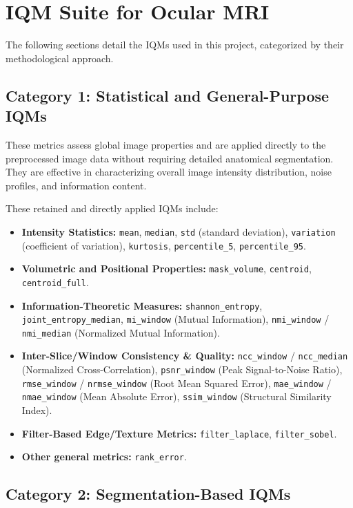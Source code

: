 \section{IQM Suite for Ocular MRI}
The following sections detail the IQMs used in this project, categorized by their methodological approach.

\subsection{Category 1: Statistical and General-Purpose IQMs}
These metrics assess global image properties and are applied directly to the preprocessed image data without requiring detailed anatomical segmentation. They are effective in characterizing overall image intensity distribution, noise profiles, and information content.

These retained and directly applied IQMs include:
\begin{itemize}
    \item \textbf{Intensity Statistics:} \texttt{mean}, \texttt{median}, \texttt{std} (standard deviation), \texttt{variation} (coefficient of variation), \texttt{kurtosis}, \texttt{percentile\_5}, \texttt{percentile\_95}.
    \item \textbf{Volumetric and Positional Properties:} \texttt{mask\_volume}, \texttt{centroid}, \texttt{centroid\_full}.
    \item \textbf{Information-Theoretic Measures:} \texttt{shannon\_entropy}, \texttt{joint\_entropy\_median}, \texttt{mi\_window} (Mutual Information), \texttt{nmi\_window} / \texttt{nmi\_median} (Normalized Mutual Information).
    \item \textbf{Inter-Slice/Window Consistency \& Quality:} \texttt{ncc\_window} / \texttt{ncc\_median} (Normalized Cross-Correlation), \texttt{psnr\_window} (Peak Signal-to-Noise Ratio), \texttt{rmse\_window} / \texttt{nrmse\_window} (Root Mean Squared Error), \texttt{mae\_window} / \texttt{nmae\_window} (Mean Absolute Error), \texttt{ssim\_window} (Structural Similarity Index).
    \item \textbf{Filter-Based Edge/Texture Metrics:} \texttt{filter\_laplace}, \texttt{filter\_sobel}.
    \item \textbf{Other general metrics:} \texttt{rank\_error}.
\end{itemize}

\subsection{Category 2: Segmentation-Based IQMs}


